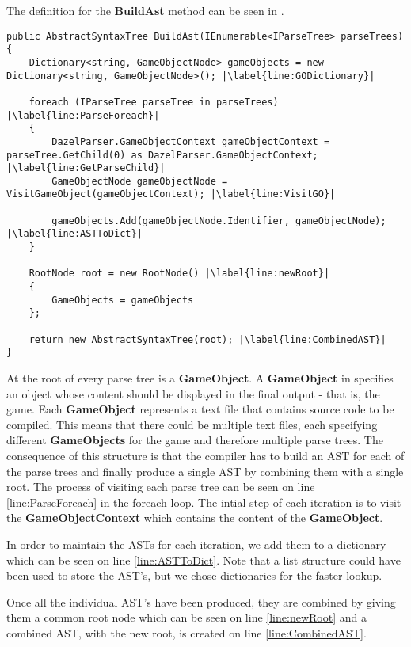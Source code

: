 The definition for the \textbf{BuildAst} method can be seen in .

\begin{lstlisting}[language=CSharp, caption={The BuildAst method}, label={lst:BuildAstMethod},escapechar=|]
public AbstractSyntaxTree BuildAst(IEnumerable<IParseTree> parseTrees)
{
    Dictionary<string, GameObjectNode> gameObjects = new Dictionary<string, GameObjectNode>(); |\label{line:GODictionary}|
    
    foreach (IParseTree parseTree in parseTrees) |\label{line:ParseForeach}|
    {
        DazelParser.GameObjectContext gameObjectContext = parseTree.GetChild(0) as DazelParser.GameObjectContext; |\label{line:GetParseChild}|
        GameObjectNode gameObjectNode = VisitGameObject(gameObjectContext); |\label{line:VisitGO}|
        
        gameObjects.Add(gameObjectNode.Identifier, gameObjectNode); |\label{line:ASTToDict}|
    }

    RootNode root = new RootNode() |\label{line:newRoot}|
    {
        GameObjects = gameObjects
    };
    
    return new AbstractSyntaxTree(root); |\label{line:CombinedAST}|
}
\end{lstlisting}

At the root of every parse tree is a \textbf{GameObject}. A \textbf{GameObject} in \dazel{} specifies an object whose content should be displayed in the final output - that is, the game. Each \textbf{GameObject} represents a text file that contains source code to be compiled. This means that there could be multiple text files, each specifying different \textbf{GameObjects} for the game and therefore multiple parse trees. 
The consequence of this structure is that the compiler has to build an AST for each of the parse trees and finally produce a single AST by combining them with a single root. The process of visiting each parse tree can be seen on line \ref{line:ParseForeach} in the foreach loop. 
The intial step of each iteration is to visit the \textbf{GameObjectContext} which contains the content of the \textbf{GameObject}.


In order to maintain the ASTs for each iteration, we add them to a dictionary which can be seen on line \ref{line:ASTToDict}. 
Note that a list structure could have been used to store the AST's, but we chose dictionaries for the faster lookup.

Once all the individual AST's have been produced, they are combined by giving them a common root node which can be seen on line \ref{line:newRoot} and a combined AST, with the new root, is created on line \ref{line:CombinedAST}.
 
